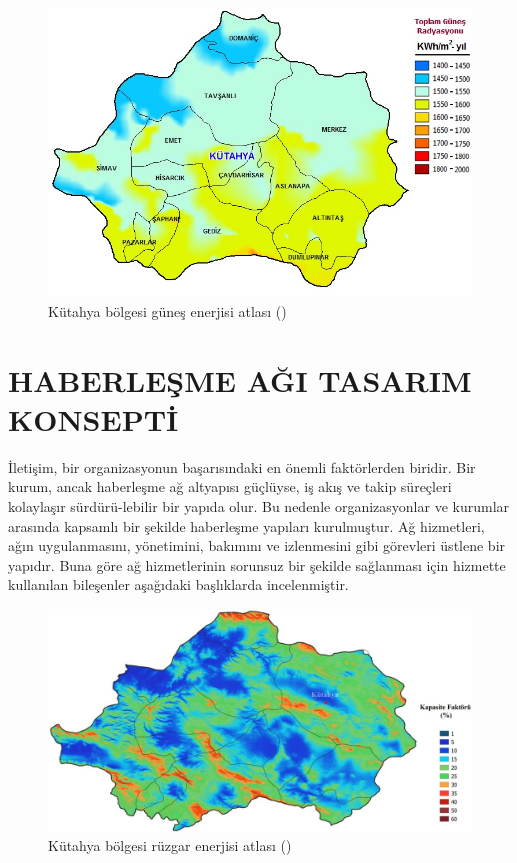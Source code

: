 \begin{figure}[htbp]
\centerline{\includegraphics[width=\columnwidth]{Resim/Sekil3-1.jpg}}
\caption{Kütahya bölgesi güneş enerjisi atlası  (\protect{}) }
\label{fig:figure7}
\end{figure}



\section{HABERLEŞME AĞI TASARIM KONSEPTİ}

İletişim, bir organizasyonun başarısındaki en önemli faktörlerden biridir. Bir kurum, ancak haberleşme ağ altyapısı güçlüyse, iş akış ve takip süreçleri kolaylaşır sürdürü-lebilir bir yapıda olur. Bu nedenle organizasyonlar ve kurumlar arasında kapsamlı bir şekilde haberleşme yapıları kurulmuştur. Ağ hizmetleri, ağın uygulanmasını, yönetimini, bakımını ve izlenmesini gibi görevleri üstlene bir yapıdır. Buna göre ağ hizmetlerinin sorunsuz bir şekilde sağlanması için hizmette kullanılan bileşenler aşağıdaki başlıklarda incelenmiştir.



\begin{figure}[htbp]
\centerline{\includegraphics[width=\columnwidth]{Resim/Sekil3-2.jpg}}
\caption{Kütahya bölgesi rüzgar enerjisi atlası  (\protect{}) }
\label{fig:figure8}
\end{figure}

